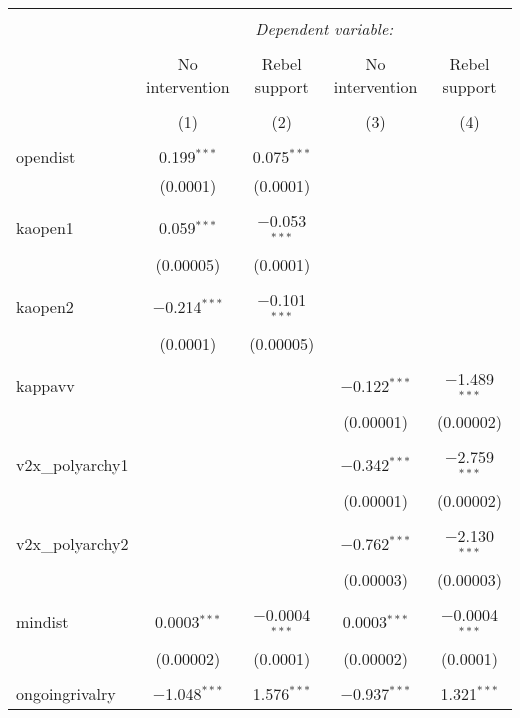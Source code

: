 
\begin{table}[!htbp] \centering 
  \caption{} 
  \label{} 
\begin{tabular}{@{\extracolsep{5pt}}lcccc} 
\\[-1.8ex]\hline 
\hline \\[-1.8ex] 
 & \multicolumn{4}{c}{\textit{Dependent variable:}} \\ 
\cline{2-5} 
\\[-1.8ex] & No intervention & Rebel support & No intervention & Rebel support \\ 
\\[-1.8ex] & (1) & (2) & (3) & (4)\\ 
\hline \\[-1.8ex] 
 opendist & 0.199$^{***}$ & 0.075$^{***}$ &  &  \\ 
  & (0.0001) & (0.0001) &  &  \\ 
  & & & & \\ 
 kaopen1 & 0.059$^{***}$ & $-$0.053$^{***}$ &  &  \\ 
  & (0.00005) & (0.0001) &  &  \\ 
  & & & & \\ 
 kaopen2 & $-$0.214$^{***}$ & $-$0.101$^{***}$ &  &  \\ 
  & (0.0001) & (0.00005) &  &  \\ 
  & & & & \\ 
 kappavv &  &  & $-$0.122$^{***}$ & $-$1.489$^{***}$ \\ 
  &  &  & (0.00001) & (0.00002) \\ 
  & & & & \\ 
 v2x\_polyarchy1 &  &  & $-$0.342$^{***}$ & $-$2.759$^{***}$ \\ 
  &  &  & (0.00001) & (0.00002) \\ 
  & & & & \\ 
 v2x\_polyarchy2 &  &  & $-$0.762$^{***}$ & $-$2.130$^{***}$ \\ 
  &  &  & (0.00003) & (0.00003) \\ 
  & & & & \\ 
 mindist & 0.0003$^{***}$ & $-$0.0004$^{***}$ & 0.0003$^{***}$ & $-$0.0004$^{***}$ \\ 
  & (0.00002) & (0.0001) & (0.00002) & (0.0001) \\ 
  & & & & \\ 
 ongoingrivalry & $-$1.048$^{***}$ & 1.576$^{***}$ & $-$0.937$^{***}$ & 1.321$^{***}$ \\ 

\end{tabular}
\end{table}
